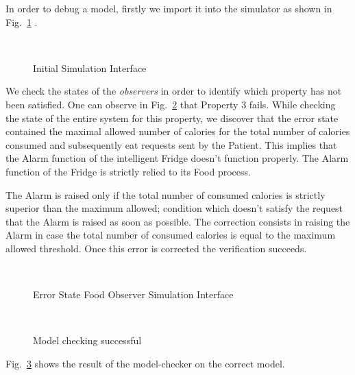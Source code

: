 \documentclass[a4paper,twoside]{article}
\begin{document}
In order to  debug  a model, firstly we import it into the simulator as shown in Fig.~\ref{fig:initialsimulationinterface} .

\begin{figure}[!h]
  \vspace{8cm}~
  \centering
  {}
  \caption{Initial Simulation Interface}
  \label{fig:initialsimulationinterface}
 \end{figure}

We check the states of the \textit{observers} in order to identify which property has not been satisfied. One can observe in Fig.~\ref{fig:errorstatefoodobserver} that Property 3 fails. While checking the state of the entire system for this property, we discover that the error state contained the maximal allowed number of calories for the total number of calories consumed and subsequently eat requests sent by the Patient. This implies that the Alarm function of the intelligent Fridge doesn't function properly. The Alarm function of the Fridge is strictly relied to its Food process. 


The Alarm is raised only if the total number of consumed calories is strictly superior than the maximum allowed; condition which doesn't satisfy the request that the Alarm is raised as soon as possible. The correction consists in raising the Alarm in case the total number of consumed calories is equal to the maximum allowed threshold. Once this error is corrected the verification succeeds.

\begin{figure}[!h]
  \vspace{8cm}~
  \centering
  {}
  \caption{Error State Food Observer Simulation Interface}
  \label{fig:errorstatefoodobserver}
 \end{figure}

\begin{figure}[!h]
  \vspace{8cm}~
  \centering
  {}
  \caption{Model checking successful}
  \label{fig:verificationok}
 \end{figure} 

Fig.~\ref{fig:verificationok} shows the result of the model-checker on the correct model.
\end{document}
